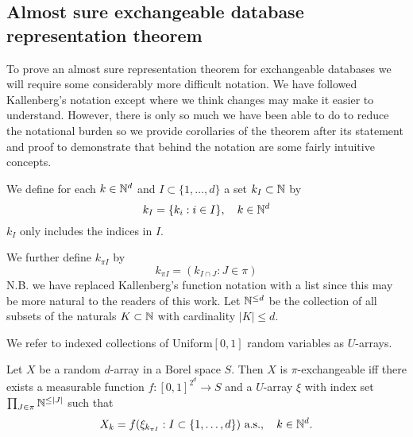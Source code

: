 \subsection{Almost sure exchangeable database representation theorem}

To prove an almost sure representation theorem for exchangeable databases we will require some considerably more difficult notation.
We have followed Kallenberg's notation except where we think changes may make it easier to understand.
However, there is only so much we have been able to do to reduce the notational burden so we provide corollaries of the theorem after its statement and proof to demonstrate that behind the notation are some fairly intuitive concepts.

We define for each $k \in \mathbb{N}^d$ and $I \subset \{1,\ldots,d\}$ a set $k_I \subset \mathbb{N}$ by
\begin{equation}
k_I = \{k_i: i \in I\}, \quad k \in \mathbb{N}^d
\end{equation}
\ie $k_I$ only includes the indices in $I$.

We further define $k_{\pi I}$ by
\begin{equation}
  k_{\pi I} = (k_{I \cap J} : J \in \pi)
\end{equation}
N.B. we have replaced Kallenberg's function notation with a list since this may be more natural to the readers of this work.
Let $\mathbb{N}^{\leq d}$ be the collection of all subsets of the naturals $K \subset \mathbb{N}$ with cardinality $|K| \leq d$.

We refer to indexed collections of \iid Uniform$[0,1]$ random variables as $U$-arrays.

\begin{prop}
\label{prop:piexas}
  Let $X$ be a random $d$-array in a Borel space $S$.
  Then $X$ is $\pi$-exchangeable iff there exists a measurable function $f:[0,1]^{2^d}\to S$ and a $U$-array $\xi$ with index set $\prod_{J\in\pi} \mathbb{N}^{\leq |J|}$ such that
  \begin{equation}
    X_k = f(\xi_{k_{\pi I}} : I \subset \{1,\ldots,d\}) \ \textrm{a.s.}, \quad k \in \mathbb{N}^d.
    \label{eq:piexas}
  \end{equation}
\end{prop}


